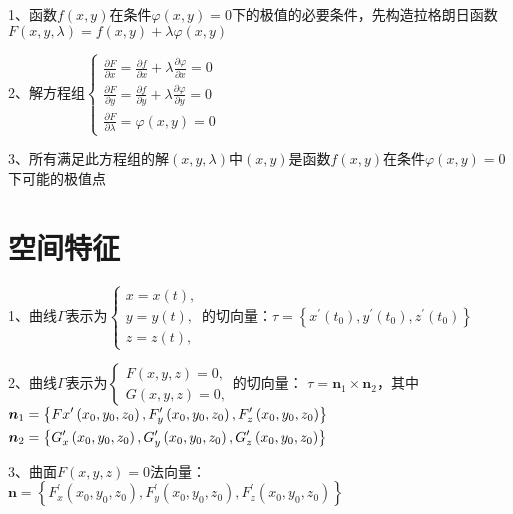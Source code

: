 1、函数$f(x, y)$在条件$\varphi(x, y)=0$下的极值的必要条件，先构造拉格朗日函数$F(x, y, \lambda)=f(x, y)+\lambda \varphi(x, y)$

2、解方程组$\left\{\begin{array}{l} \frac{\partial F}{\partial x}=\frac{\partial f}{\partial x}+\lambda \frac{\partial \varphi}{\partial x}=0 \\ \frac{\partial F}{\partial y}=\frac{\partial f}{\partial y}+\lambda \frac{\partial \varphi}{\partial y}=0 \\ \frac{\partial F}{\partial \lambda}=\varphi(x, y)=0 \end{array}\right.$

3、所有满足此方程组的解$(x, y, \lambda)$中$(x, y)$是函数$f(x, y)$在条件$\varphi(x, y)=0$下可能的极值点

\section{空间特征}

1、曲线$\Gamma$表示为$\left\{\begin{array}{l}x=x(t), \\ y=y(t),  \\ z=z(t),\end{array}\right.$的切向量：$\tau=\left\{x^{\prime}\left(t_{0}\right), y^{\prime}\left(t_{0}\right), z^{\prime}\left(t_{0}\right)\right\}$

2、曲线$\Gamma$表示为$\left\{\begin{array}{l}F(x, y, z)=0,\\ G(x, y, z)=0,\end{array}\right.$的切向量： $\tau=\boldsymbol{n}_{1} \times \boldsymbol{n}_{2}$，其中$\newline\begin{aligned} &\boldsymbol{n}_{1}=\left\{F{x}^{\prime}\left(x_{0}, y_{0}, z_{0}\right), F_{y}^{\prime}\left(x_{0}, y_{0}, z_{0}\right), F_{z}^{\prime}\left(x_{0}, y_{0}, z_{0}\right)\right\} \\ &\boldsymbol{n}_{2}=\left\{G_{x}^{\prime}\left(x_{0}, y_{0}, z_{0}\right), G_{y}^{\prime}\left(x_{0}, y_{0}, z_{0}\right), G_{z}^{\prime}\left(x_{0}, y_{0}, z_{0}\right)\right\} \end{aligned}$

3、曲面$F(x, y, z)=0$法向量：$\boldsymbol{n}=\left\{F_{x}^{\prime}\left(x_{0}, y_{0}, z_{0}\right), F_{y}^{\prime}\left(x_{0}, y_{0}, z_{0}\right), F_{z}^{\prime}\left(x_{0}, y_{0}, z_{0}\right)\right\}$

